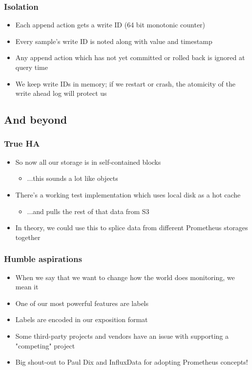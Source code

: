 \documentclass[t]{beamer}
\begin{document}
\begin{frame}
	\frametitle{Isolation}
	\begin{itemize}
		\item Each append action gets a write ID (64 bit monotonic counter)
		\item Every sample's write ID is noted along with value and timestamp
		\item Any append action which has not yet committed or rolled back is ignored at query time
		\item We keep write IDs in memory; if we restart or crash, the atomicity of the write ahead log will protect us
	\end{itemize}
\end{frame}


\subsection{And beyond}

\begin{frame}
	\frametitle{True HA}
	\begin{itemize}
		\item So now all our storage is in self-contained blocks
		\begin{itemize}
			\item ...this sounds a lot like objects
		\end{itemize}
		\item There's a working test implementation which uses local disk as a hot cache
		\begin{itemize}
			\item ...and pulls the rest of that data from S3
		\end{itemize}
		\item In theory, we could use this to splice data from different Prometheus storages together
	\end{itemize}
\end{frame}

\begin{frame}
	\frametitle{Humble aspirations}
	\begin{itemize}
		\item When we say that we want to change how the world does monitoring, we mean it
		\item One of our most powerful features are labels
		\item Labels are encoded in our exposition format
		\item Some third-party projects and vendors have an issue with supporting a "competing" project
		\item Big shout-out to Paul Dix and InfluxData for adopting Prometheus concepts!
	\end{itemize}
\end{frame}
\end{document}
